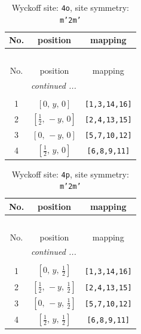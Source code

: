 \documentclass[fleqn,8pt]{jsarticle}
\begin{document}
\renewcommand{\arraystretch}{1.2}
\begin{longtable}{ccc}
\caption{Wyckoff site: {\tt 4o}, site symmetry: {\tt m'2m'}}
 \\
 \hline \hline
No. & position & mapping \\ \hline \endfirsthead

\multicolumn{2}{l}{\tablename\ \thetable{}} \\
 \hline \hline
No. & position & mapping \\ \hline \endhead

 \hline \hline
\multicolumn{2}{r}{\footnotesize\it continued ...} \\ \endfoot

 \hline \hline
\multicolumn{2}{r}{} \\ \endlastfoot

1 & $\left[ 0,\, y,\, 0 \right]$ & {\tt [1,3,14,16]} \\ \hline
2 & $\left[ \frac{1}{2},\, - y,\, 0 \right]$ & {\tt [2,4,13,15]} \\ \hline
3 & $\left[ 0,\, - y,\, 0 \right]$ & {\tt [5,7,10,12]} \\ \hline
4 & $\left[ \frac{1}{2},\, y,\, 0 \right]$ & {\tt [6,8,9,11]} \\
\end{longtable}
\renewcommand{\arraystretch}{1.2}
\begin{longtable}{ccc}
\caption{Wyckoff site: {\tt 4p}, site symmetry: {\tt m'2m'}}
 \\
 \hline \hline
No. & position & mapping \\ \hline \endfirsthead

\multicolumn{2}{l}{\tablename\ \thetable{}} \\
 \hline \hline
No. & position & mapping \\ \hline \endhead

 \hline \hline
\multicolumn{2}{r}{\footnotesize\it continued ...} \\ \endfoot

 \hline \hline
\multicolumn{2}{r}{} \\ \endlastfoot

1 & $\left[ 0,\, y,\, \frac{1}{2} \right]$ & {\tt [1,3,14,16]} \\ \hline
2 & $\left[ \frac{1}{2},\, - y,\, \frac{1}{2} \right]$ & {\tt [2,4,13,15]} \\ \hline
3 & $\left[ 0,\, - y,\, \frac{1}{2} \right]$ & {\tt [5,7,10,12]} \\ \hline
4 & $\left[ \frac{1}{2},\, y,\, \frac{1}{2} \right]$ & {\tt [6,8,9,11]} \\
\end{longtable}
\end{document}
